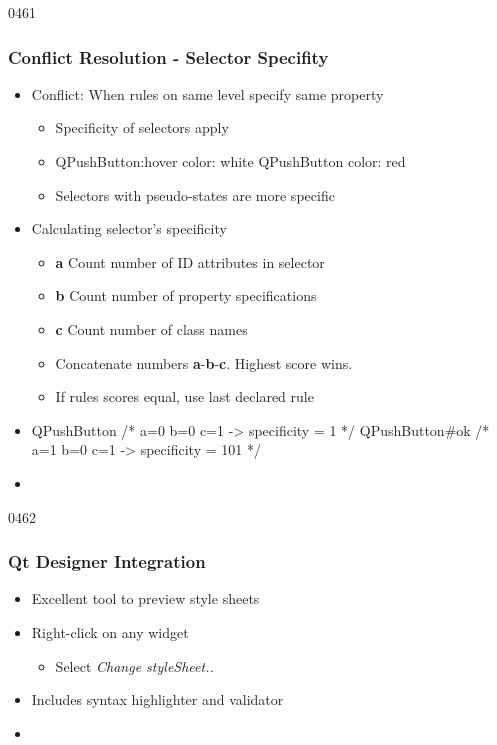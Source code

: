 \begin{slide}[fragile]{0461}\frametitle{Conflict Resolution - Selector Specifity}
\begin{itemize}
\item Conflict: When rules on same level specify same property
  \begin{itemize}
  \item Specificity of selectors apply
\item[]
  \begin{cpp}
QPushButton:hover { color: white }
QPushButton { color: red }    
  \end{cpp}
\item Selectors with pseudo-states are more specific
  \end{itemize}
\item Calculating selector's specificity
 \begin{itemize}
  \item \textbf{a} Count number of ID attributes in selector
  \item \textbf{b} Count number of property specifications
  \item \textbf{c} Count number of class names
  \item Concatenate numbers \textbf{a}-\textbf{b}-\textbf{c}. Highest score wins.
  \item If rules scores equal, use last declared rule
  \end{itemize}
\item[]
  \begin{cpp}
QPushButton {}     /* a=0 b=0 c=1 -> specificity =   1 */    
QPushButton#ok {}  /* a=1 b=0 c=1 -> specificity =   101 */    
  \end{cpp}

\item[] 
\end{itemize}
\end{slide}


\begin{slide}{0462}\frametitle{Qt Designer Integration}
\begin{itemize}
\item Excellent tool to preview style sheets
\item Right-click on any widget
  \begin{itemize}
  \item Select \textit{Change styleSheet..}
  \end{itemize}
\item Includes syntax highlighter and validator
\item[] 
\end{itemize}
\end{slide}

